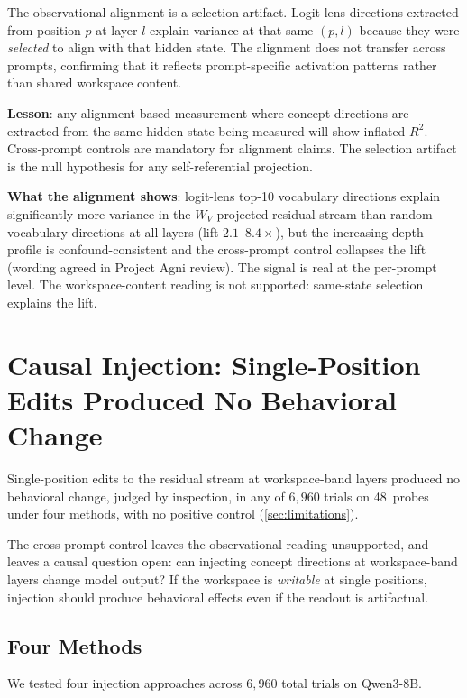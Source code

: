 \documentclass[11pt,a4paper]{article}
\begin{document}
The observational alignment is a selection artifact. Logit-lens
directions extracted from position $p$ at layer $l$ explain variance
at that same $(p, l)$ because they were \emph{selected} to align with
that hidden state. The alignment does not transfer across prompts,
confirming that it reflects prompt-specific activation patterns rather
than shared workspace content.

\textbf{Lesson}: any alignment-based measurement where concept
directions are extracted from the same hidden state being measured will
show inflated $R^2$. Cross-prompt controls are mandatory for alignment
claims. The selection artifact is the null hypothesis for any
self-referential projection.

\textbf{What the alignment shows}: logit-lens top-10 vocabulary
directions explain significantly more variance in the $W_V$-projected
residual stream than random vocabulary directions at all layers (lift
$2.1$--$8.4\times$), but the increasing depth profile is
confound-consistent and the cross-prompt control collapses the lift
(wording agreed in Project Agni review). The signal is real at the
per-prompt level. The workspace-content reading is not supported:
same-state selection explains the lift.

\section{Causal Injection: Single-Position Edits Produced No Behavioral Change}
\label{sec:causal}

Single-position edits to the residual stream at workspace-band layers
produced no behavioral change, judged by inspection, in any of
$6{,}960$ trials on 48~probes under four methods, with no positive
control (\cref{sec:limitations}).

The cross-prompt control leaves the observational reading unsupported,
and leaves a causal question open: can injecting concept directions at
workspace-band layers change model output? If the workspace is
\emph{writable} at single positions, injection should produce
behavioral effects even if the readout is artifactual.

\subsection{Four Methods}

We tested four injection approaches across $6{,}960$ total trials on
Qwen3-8B.
\end{document}
